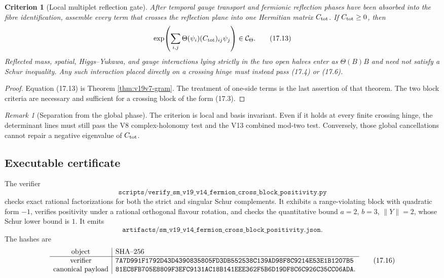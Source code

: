 \documentclass[11pt]{article}
\newtheorem{criterion}[theorem]{Criterion}
\theoremstyle{remark}
\newtheorem{remark}[theorem]{Remark}
\begin{document}
\begin{criterion}[Local multiplet reflection gate]
\label{crit:v19v14-local}
After temporal gauge transport and fermionic reflection phases have been
absorbed into the fibre identification, assemble every term that crosses
the reflection plane into one Hermitian matrix \(C_{\rm tot}\).
If \(C_{\rm tot}\geq0\), then
\[
 \exp\!\left(\sum_{i,j}\Theta(\psi_i)
 (C_{\rm tot})_{ij}\psi_j\right)\in{\cal C}_\Theta.            \tag{17.13}
\]
Reflected mass, spatial, Higgs--Yukawa, and gauge interactions lying
strictly in the two open halves enter as \(\Theta(B)B\) and need not satisfy
a Schur inequality.  Any such interaction placed directly on a crossing
hinge must instead pass (17.4) or (17.6).
\end{criterion}

\begin{proof}
Equation (17.13) is Theorem \ref{thm:v19v7-gram}.  The treatment of
one-side terms is the last assertion of that theorem.  The two block
criteria are necessary and sufficient for a crossing block of the form
(17.3).
\end{proof}

\begin{remark}[Separation from the global phase]
\label{rem:v19v14-global}
The criterion is local and basis invariant.  Even if it holds at every
finite crossing hinge, the determinant lines must still pass the V8
complex-holonomy test and the V13 combined mod-two test.  Conversely, those
global cancellations cannot repair a negative eigenvalue of
\(C_{\rm tot}\).
\end{remark}

\subsection{Executable certificate}

The verifier
\[
 \texttt{scripts/verify\_sm\_v19\_v14\_fermion\_cross\_block\_positivity.py}
                                                                  \tag{17.14}
\]
checks exact rational factorizations for both the strict and singular
Schur complements.  It exhibits a range-violating block with quadratic
form \(-1\), verifies positivity under a rational orthogonal flavour
rotation, and checks the quantitative bound
\(a=2\), \(b=3\), \(\|Y\|=2\), whose Schur lower bound is \(1\).
It emits
\[
 \texttt{artifacts/sm\_v19\_v14\_fermion\_cross\_block\_positivity.json}.
                                                                  \tag{17.15}
\]
The hashes are
\[
\begin{array}{c|l}
\hbox{object}&\hbox{SHA--256}\\ \hline
\hbox{verifier}&
\texttt{7A7D991F1792D43D4390835805FD3DB552538C139AD98F8C9214E53E1B1207B5}\\
\hbox{canonical payload}&
\texttt{81EC8FB705E8809F3EFC9131AC18B141EEE362F5B6D19DF8C6C926C35CC06ADA}.
\end{array}                                                     \tag{17.16}
\]
\end{document}
